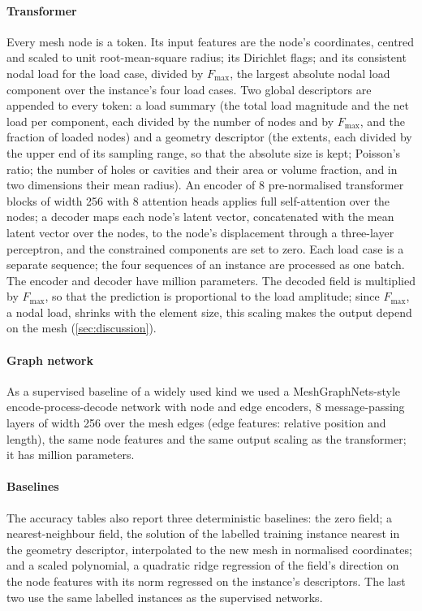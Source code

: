 \paragraph{Transformer}
Every mesh node is a token. Its input features are the node's coordinates, centred and
scaled to unit root-mean-square radius; its Dirichlet flags; and its consistent nodal load
for the load case, divided by $F_{\max}$, the largest absolute nodal load component over the
instance's four load cases. Two global descriptors are appended to every token: a load
summary (the total load magnitude and the net load per component, each divided by the number
of nodes and by $F_{\max}$, and the fraction of loaded nodes) and a geometry descriptor (the
extents, each divided by the upper end of its sampling range, so that the absolute size is
kept; Poisson's ratio; the number of holes or cavities and their area or volume fraction,
and in two dimensions their mean radius). An encoder of 8 pre-normalised transformer blocks
\cite{Vaswani2017} of width 256 with 8 attention heads applies full self-attention over the
nodes; a decoder maps each node's latent vector, concatenated with the mean latent vector
over the nodes, to the node's displacement through a three-layer perceptron, and the
constrained components are set to zero. Each load case is a separate sequence; the four
sequences of an instance are processed as one batch. The encoder and decoder have
\numParamsTransformer{} million parameters. The decoded field is multiplied by $F_{\max}$,
so that the prediction is proportional to the load amplitude; since $F_{\max}$, a nodal
load, shrinks with the element size, this scaling makes the output depend on the mesh
(\cref{sec:discussion}).

\paragraph{Graph network}
As a supervised baseline of a widely used kind we used a MeshGraphNets-style
encode-process-decode network \cite{Pfaff2021} with node and edge encoders, 8
message-passing layers of width 256 over the mesh edges (edge features: relative position
and length), the same node features and the same output scaling as the transformer; it has
\numParamsGraph{} million parameters.

\paragraph{Baselines}
The accuracy tables also report three deterministic baselines: the zero field; a
nearest-neighbour field, the solution of the labelled training instance nearest in the
geometry descriptor, interpolated to the new mesh in normalised coordinates; and a scaled
polynomial, a quadratic ridge regression of the field's direction on the node features with
its norm regressed on the instance's descriptors. The last two use the same labelled
instances as the supervised networks.

